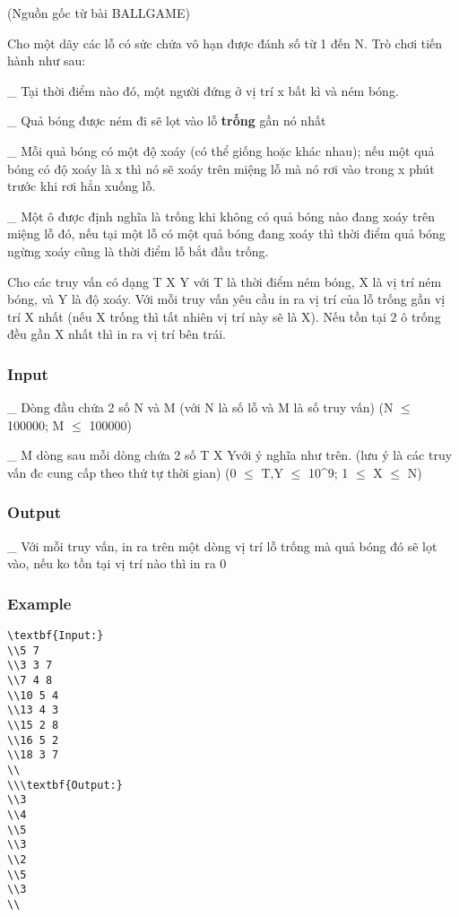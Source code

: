 



   (Nguồn gốc từ bài BALLGAME)  

   Cho một dãy các lỗ có sức chứa vô hạn được đánh số từ 1 đến N. Trò chơi tiến hành như sau:  

   \_ Tại thời điểm nào đó, một người đứng ở vị trí x bất kì và ném bóng.  

   \_ Quả bóng được ném đi sẽ lọt vào lỗ   \textbf{    trống   }   gần nó nhất  

   \_ Mỗi quả bóng có một độ xoáy (có thể giống hoặc khác nhau); nếu một quả bóng có độ xoáy là x thì nó sẽ xoáy trên miệng lỗ mà nó rơi vào trong x phút trước khi rơi hẳn xuống lỗ.  

   \_ Một ô được định nghĩa là trống khi không có quả bóng nào đang xoáy trên miệng lỗ đó, nếu tại một lỗ có một quả bóng đang xoáy thì thời điểm quả bóng ngừng xoáy cũng là thời điểm lỗ bắt đầu trống.  

   Cho các truy vấn có dạng T X Y với T là thời điểm ném bóng, X là vị trí ném bóng, và Y là độ xoáy. Với mỗi truy vấn yêu cầu in ra vị trí của lỗ trống gần vị trí X nhất (nếu X trống thì tất nhiên vị trí này sẽ là X). Nếu tồn tại 2 ô trống đều gần X nhất thì in ra vị trí bên trái.  

\subsubsection{   Input  }

   \_ Dòng đầu chứa 2 số N và M (với N là số lỗ và M là số truy vấn) (N $\le$ 100000; M $\le$ 100000)  

   \_ M dòng sau mỗi dòng chứa 2 số T X Yvới ý nghĩa như trên. (lưu ý là các truy vấn đc cung cấp theo thứ tự thời gian) (0 $\le$ T,Y $\le$ 10^9; 1 $\le$ X $\le$ N)  

\subsubsection{   Output  }

   \_ Với mỗi truy vấn, in ra trên một dòng vị trí lỗ trống mà quả bóng đó sẽ lọt vào, nếu ko tồn tại vị trí nào thì in ra 0  

\subsubsection{   Example  }
\begin{verbatim}
\textbf{Input:}
\\5 7
\\3 3 7
\\7 4 8
\\10 5 4
\\13 4 3
\\15 2 8
\\16 5 2
\\18 3 7
\\
\\\textbf{Output:}
\\3
\\4
\\5
\\3
\\2
\\5
\\3
\\\end{verbatim}
